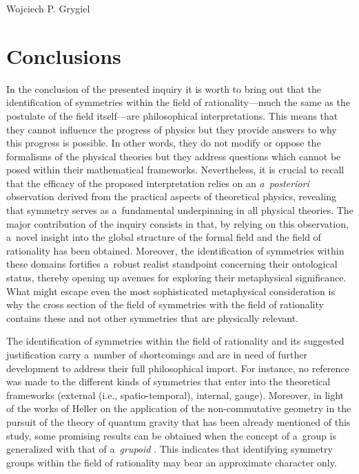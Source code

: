 \begin{artengenv}{Wojciech P. Grygiel}
\section*{Conclusions}

In the conclusion of the presented inquiry it is worth to bring out that the identification of symmetries within the field of rationality---much the same as the postulate of the field itself---are philosophical interpretations. This means that they cannot influence the progress of physics but they provide answers to why this progress is possible. In other words, they do not modify or oppose the formalisms of the physical theories but they address questions which cannot be posed within their mathematical frameworks. Nevertheless, it is crucial to recall that the efficacy of the proposed interpretation relies on an \textit{a~posteriori} observation derived from the practical aspects of theoretical physics, revealing that symmetry serves as a~fundamental underpinning in all physical theories. The major contribution of the inquiry consists in that, by relying on this observation, a~novel insight into the global structure of the formal field and the field of rationality has been obtained. Moreover, the identification of symmetries within these domains fortifies a~robust realist standpoint concerning their ontological status, thereby opening up avenues for exploring their metaphysical significance. What might escape even the most sophisticated metaphysical consideration is why the cross section of the field of symmetries with the field of rationality contains these and not other symmetries that are physically relevant.



The identification of symmetries within the field of rationality and its suggested justification carry a~number of shortcomings and are in need of further development to address their full philosophical import. For instance, no reference was made to the different kinds of symmetries that enter into the theoretical frameworks (external (i.e., spatio-temporal), internal, gauge). Moreover, in light of the works of Heller on the application of the non-commutative geometry in the pursuit of the theory of quantum gravity that has been already mentioned of this study, some promising results can be obtained when the concept of a~group is generalized with that of a~\textit{grupoid} 
\parencite[e.g][]{heller_evolution_2006}. %
 This indicates that identifying symmetry groups within the field of rationality may bear an approximate character only.




\end{artengenv}
